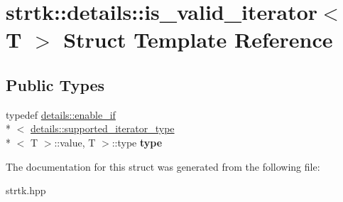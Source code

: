 \hypertarget{structstrtk_1_1details_1_1is__valid__iterator}{\section{strtk\-:\-:details\-:\-:is\-\_\-valid\-\_\-iterator$<$ T $>$ Struct Template Reference}
\label{structstrtk_1_1details_1_1is__valid__iterator}
}
\subsection*{Public Types}
\begin{DoxyCompactItemize}
\item 
\hypertarget{structstrtk_1_1details_1_1is__valid__iterator_ac308c7879815462dfe52434ab338d4df}{typedef \hyperlink{structstrtk_1_1details_1_1enable__if}{details\-::enable\-\_\-if}\\*
$<$ \hyperlink{structstrtk_1_1details_1_1supported__iterator__type}{details\-::supported\-\_\-iterator\-\_\-type}\\*
$<$ T $>$\-::value, T $>$\-::type {\bfseries type}}\label{structstrtk_1_1details_1_1is__valid__iterator_ac308c7879815462dfe52434ab338d4df}

\end{DoxyCompactItemize}


The documentation for this struct was generated from the following file\-:\begin{DoxyCompactItemize}
\item 
strtk.\-hpp\end{DoxyCompactItemize}
